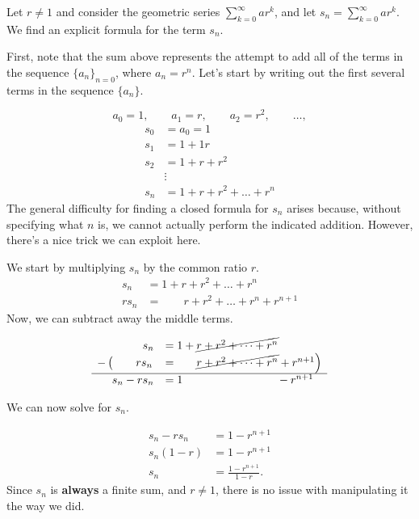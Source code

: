 \documentclass{ximera}
\begin{document}
\begin{example}
 Let $r \neq 1$ and consider the geometric series $\sum_{k=0}^\infty a r^k$, and let $s_n = \sum_{k=0}^{\infty} a r^k $.  We find an explicit formula for the term $s_n$.
  
  \begin{explanation}
First, note that the sum above represents the attempt to add all of the terms in the sequence $\{a_n\}_{n=0}$, where $a_n =  r^n$.  Let's start by writing out the first several terms in the sequence $\{a_n\}$.  

\[
a_0 = 1 , \qquad a_1 = r, \qquad a_2 = r^2 , \qquad \ldots ,
\]
    \begin{align*}
      s_0 &= a_0 = 1 \\
      s_1 &= 1 + 1r\\
      s_2 &= 1 + r + r^2\\
      &\vdots\\
      s_n &= 1 + r + r^2 + \dots + r^n
    \end{align*}
The general difficulty for finding a closed formula for $s_n$ arises because, without specifying what $n$ is, we cannot actually perform the indicated addition.  However, there's a nice trick we can exploit here.

We start by multiplying $s_n$ by the common ratio $r$.
    \begin{align*}
      s_n   &= 1 + r + r^2 + \dots + r^n\\
      r s_n &= ~ \phantom{ 1 + } r + r^2 + \dots + r^n + r^{n+1}
    \end{align*}
Now, we can subtract away the middle terms.

 \[     \begin{array}{rl}
      s_n   &= 1 + \cancel{ r + r^2 + \dots + r^n}\\
 -\left(  \phantom{ r^{n+1}} r s_n \right.&=~ \left. \phantom{  1 +  } \cancel{r + r^2 + \dots + r^n} + r^{n+1}\right) \\
 \hline 
     s_n - r s_n &= 1 \phantom{  +  r + r^2 + \dots + r^n } ~ - r^{n+1}\\
    \end{array}
 \]   
 
 We can now solve for $s_n$.
 
     \begin{align*}
      s_n - r s_n &= 1 - r^{n+1}\\
      s_n(1-r)    &= 1 - r^{n+1}\\
      s_n &= \frac{1 - r^{n+1}}{1-r}.
    \end{align*}
    Since $s_n$ is \textbf{always} a finite sum, and $r \ne 1$, there is no issue
    with manipulating it the way we did.
  \end{explanation}
\end{example}
\end{document}
